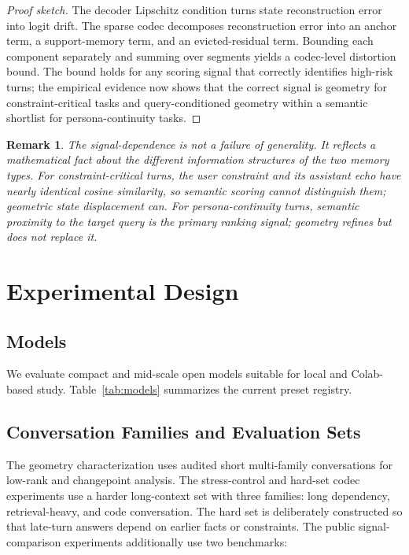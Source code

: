 \documentclass[conference]{IEEEtran}
\newtheorem{remark}{Remark}
\begin{document}
\begin{proof}[Proof sketch]
The decoder Lipschitz condition turns state reconstruction error into logit drift. The sparse codec decomposes reconstruction error into an anchor term, a support-memory term, and an evicted-residual term. Bounding each component separately and summing over segments yields a codec-level distortion bound. The bound holds for any scoring signal that correctly identifies high-risk turns; the empirical evidence now shows that the correct signal is geometry for constraint-critical tasks and query-conditioned geometry within a semantic shortlist for persona-continuity tasks.
\end{proof}

\begin{remark}
The signal-dependence is not a failure of generality. It reflects a mathematical fact about the different information structures of the two memory types. For constraint-critical turns, the user constraint and its assistant echo have nearly identical cosine similarity, so semantic scoring cannot distinguish them; geometric state displacement can. For persona-continuity turns, semantic proximity to the target query is the primary ranking signal; geometry refines but does not replace it.
\end{remark}

\section{Experimental Design}
\subsection{Models}
We evaluate compact and mid-scale open models suitable for local and Colab-based study. Table~\ref{tab:models} summarizes the current preset registry.

\begin{table}[t]
    \centering
    \caption{Current model registry used across the checkpoint.}
    \label{tab:models}
    \resizebox{\columnwidth}{!}{}
\end{table}

\subsection{Conversation Families and Evaluation Sets}
The geometry characterization uses audited short multi-family conversations for low-rank and changepoint analysis. The stress-control and hard-set codec experiments use a harder long-context set with three families: long dependency, retrieval-heavy, and code conversation. The hard set is deliberately constructed so that late-turn answers depend on earlier facts or constraints. The public signal-comparison experiments additionally use two benchmarks:
\end{document}

